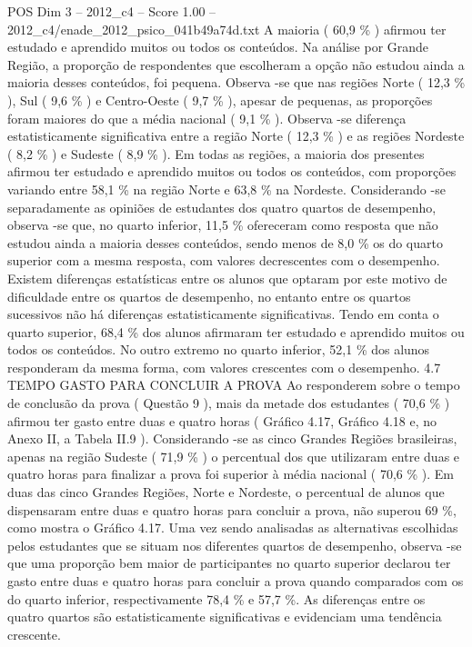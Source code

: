 \begin{textsample}{POS Dim 3 – 2012\_c4 – Score 1.00 – 2012\_c4/enade\_2012\_psico\_041b49a74d.txt}
A maioria ( 60,9 \% ) afirmou ter estudado e aprendido muitos ou todos os conteúdos.
Na análise por Grande Região, a proporção de respondentes que escolheram a opção não estudou ainda a maioria desses conteúdos, foi pequena.
Observa -se que nas regiões Norte ( 12,3 \% ), Sul ( 9,6 \% ) e Centro-Oeste ( 9,7 \% ), apesar de pequenas, as proporções foram maiores do que a média nacional ( 9,1 \% ).
Observa -se diferença estatisticamente significativa entre a região Norte ( 12,3 \% ) e as regiões Nordeste ( 8,2 \% ) e Sudeste ( 8,9 \% ).
Em todas as regiões, a maioria dos presentes afirmou ter estudado e aprendido muitos ou todos os conteúdos, com proporções variando entre 58,1 \% na região Norte e 63,8 \% na Nordeste.
Considerando -se separadamente as opiniões de estudantes dos quatro quartos de desempenho, observa -se que, no quarto inferior, 11,5 \% ofereceram como resposta que não estudou ainda a maioria desses conteúdos, sendo menos de 8,0 \% os do quarto superior com a mesma resposta, com valores decrescentes com o desempenho.
Existem diferenças estatísticas entre os alunos que optaram por este motivo de dificuldade entre os quartos de desempenho, no entanto entre os quartos sucessivos não há diferenças estatisticamente significativas.
Tendo em conta o quarto superior, 68,4 \% dos alunos afirmaram ter estudado e aprendido muitos ou todos os conteúdos.
No outro extremo no quarto inferior, 52,1 \% dos alunos responderam da mesma forma, com valores crescentes com o desempenho. 4.7 TEMPO GASTO PARA CONCLUIR A PROVA Ao responderem sobre o tempo de conclusão da prova ( Questão 9 ), mais da metade dos estudantes ( 70,6 \% ) afirmou ter gasto entre duas e quatro horas ( Gráfico 4.17, Gráfico 4.18 e, no Anexo II, a Tabela II.9 ).
Considerando -se as cinco Grandes Regiões brasileiras, apenas na região Sudeste ( 71,9 \% ) o percentual dos que utilizaram entre duas e quatro horas para finalizar a prova foi superior à média nacional ( 70,6 \% ).
Em duas das cinco Grandes Regiões, Norte e Nordeste, o percentual de alunos que dispensaram entre duas e quatro horas para concluir a prova, não superou 69 \%, como mostra o Gráfico 4.17.
Uma vez sendo analisadas as alternativas escolhidas pelos estudantes que se situam nos diferentes quartos de desempenho, observa -se que uma proporção bem maior de participantes no quarto superior declarou ter gasto entre duas e quatro horas para concluir a prova quando comparados com os do quarto inferior, respectivamente 78,4 \% e 57,7 \%.
As diferenças entre os quatro quartos são estatisticamente significativas e evidenciam uma tendência crescente.

\end{textsample}

